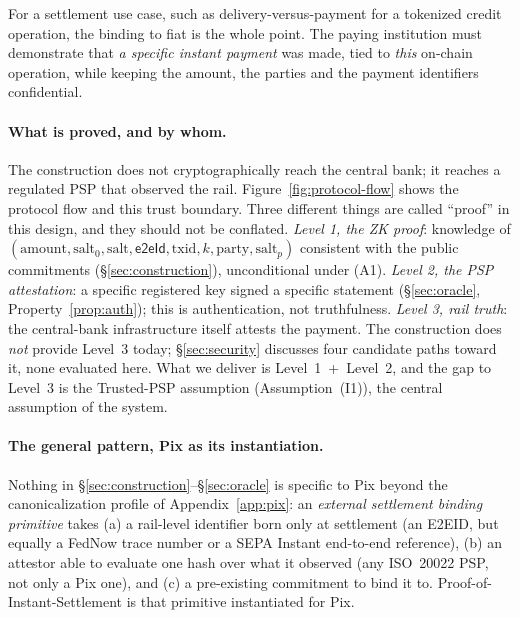 \documentclass[11pt]{article}
\newcommand{\eeid}{\ensuremath{\mathsf{e2eId}}}
\begin{document}
For a settlement use case, such as delivery-versus-payment for a tokenized
credit operation, the binding to fiat is the whole point. The paying
institution must demonstrate that \emph{a specific instant payment} was made,
tied to \emph{this} on-chain operation, while keeping the amount, the parties
and the payment identifiers confidential.

\paragraph{What is proved, and by whom.}
The construction does not cryptographically reach the central bank; it reaches
a regulated PSP that observed the rail. Figure~\ref{fig:protocol-flow} shows
the protocol flow and this trust boundary. Three different things are called
``proof'' in this design, and they should not be conflated. \emph{Level 1, the
ZK proof}: knowledge of $(\text{amount},\text{salt}_0,
\text{salt},\eeid,\text{txid},k,\text{party},\text{salt}_p)$ consistent with
the public commitments (\S\ref{sec:construction}), unconditional under (A1).
\emph{Level 2, the PSP attestation}: a specific registered key signed a
specific statement (\S\ref{sec:oracle}, Property~\ref{prop:auth}); this is
authentication, not truthfulness. \emph{Level 3, rail truth}: the central-bank
infrastructure itself attests the payment. The construction does \emph{not}
provide Level~3 today; \S\ref{sec:security} discusses four candidate paths
toward it, none evaluated here. What we deliver is Level~1~+~Level~2, and the
gap to Level~3 is the Trusted-PSP assumption (Assumption~(I1)), the central
assumption of the system.

\paragraph{The general pattern, Pix as its instantiation.} Nothing in
\S\ref{sec:construction}--\S\ref{sec:oracle} is specific to Pix beyond the
canonicalization profile of Appendix~\ref{app:pix}: an \emph{external
settlement binding primitive} takes (a) a rail-level identifier born only at
settlement (an E2EID, but equally a FedNow trace number or a SEPA Instant
end-to-end reference), (b) an attestor able to evaluate one hash over what it
observed (any ISO~20022 PSP, not only a Pix one), and (c) a pre-existing
commitment to bind it to. Proof-of-Instant-Settlement is that primitive
instantiated for Pix.
\end{document}
